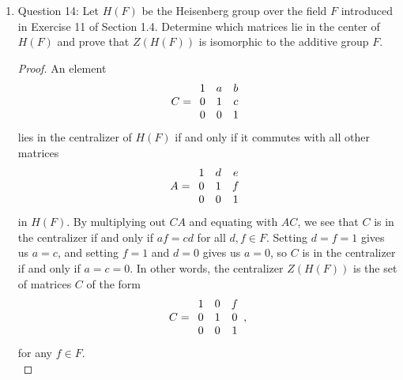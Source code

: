 \documentclass{article}
\begin{document}
\begin{enumerate}
\begin{enumerate}
      \item Question 14: Let $H(F)$ be the Heisenberg group over the field
        $F$ introduced in Exercise 11 of Section 1.4. Determine which
        matrices lie in the center of $H(F)$ and prove that $Z(H(F))$ is
        isomorphic to the additive group $F$.

        \begin{proof}
          An element
          \begin{align*}
            C = 
            \begin{array}{*{3}c}
              1 & a & b \\
              0 & 1 & c \\
              0 & 0 & 1 \\
            \end{array}
          \end{align*}
          lies in the centralizer of $H(F)$ if and only if it commutes with
          all other matrices
          \begin{align*}
            A = 
            \begin{array}{*{3}c}
              1 & d & e \\
              0 & 1 & f \\
              0 & 0 & 1 \\
            \end{array}
          \end{align*}
          in $H(F)$. By multiplying out $CA$ and equating with $AC$, we
          see that $C$ is in the centralizer if and only if $af=cd$ for all
          $d,f\in F$. Setting $d=f=1$ gives us $a=c$, and setting $f=1$ and
          $d=0$ gives us $a=0$, so $C$ is in the centralizer if and only if
          $a=c=0$. In other words, the centralizer $Z(H(F))$ is the set of
          matrices $C$ of the form
          \begin{align*}
            C = 
            \begin{array}{*{3}c}
              1 & 0 & f \\
              0 & 1 & 0 \\
              0 & 0 & 1 \\
            \end{array},
          \end{align*}
          for any $f\in F$. \\


\end{proof}
\end{enumerate}
\end{enumerate}
\end{document}
